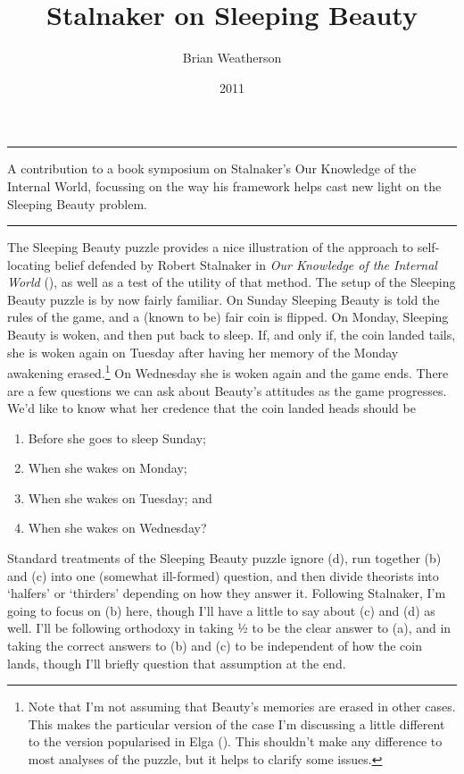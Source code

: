 \documentclass[
  10pt,
  letterpaper,
  DIV=11,
  numbers=noendperiod,
  twoside]{scrartcl}
\title{Stalnaker on Sleeping Beauty}
\author{Brian Weatherson}
\date{2011}
\providecommand{\tightlist}{%
  \setlength{\itemsep}{0pt}\setlength{\parskip}{0pt}}\usepackage{longtable,booktabs,array}
\renewenvironment{abstract}
 {\vspace{-1.25cm}
 \quotation\small\noindent\rule{\linewidth}{.5pt}\par\smallskip
 \noindent }
 {\par\noindent\rule{\linewidth}{.5pt}\endquotation}
\begin{document}
\maketitle
\begin{abstract}
A contribution to a book symposium on Stalnaker's Our Knowledge of the
Internal World, focussing on the way his framework helps cast new light
on the Sleeping Beauty problem.
\end{abstract}


The Sleeping Beauty puzzle provides a nice illustration of the approach
to self-locating belief defended by Robert Stalnaker in \emph{Our
Knowledge of the Internal World} (), as well as a test of the utility of that method. The setup of
the Sleeping Beauty puzzle is by now fairly familiar. On Sunday Sleeping
Beauty is told the rules of the game, and a (known to be) fair coin is
flipped. On Monday, Sleeping Beauty is woken, and then put back to
sleep. If, and only if, the coin landed tails, she is woken again on
Tuesday after having her memory of the Monday awakening
erased.\footnote{Note that I'm not assuming that Beauty's memories are
  erased in other cases. This makes the particular version of the case
  I'm discussing a little different to the version popularised in Elga
  (). This shouldn't make any difference to
  most analyses of the puzzle, but it helps to clarify some issues.} On
Wednesday she is woken again and the game ends. There are a few
questions we can ask about Beauty's attitudes as the game progresses.
We'd like to know what her credence that the coin landed heads should be

\begin{enumerate}
\def\labelenumi{\arabic{enumi}.}
\tightlist
\item
  Before she goes to sleep Sunday;
\item
  When she wakes on Monday;
\item
  When she wakes on Tuesday; and
\item
  When she wakes on Wednesday?
\end{enumerate}

Standard treatments of the Sleeping Beauty puzzle ignore (d), run
together (b) and (c) into one (somewhat ill-formed) question, and then
divide theorists into `halfers' or `thirders' depending on how they
answer it. Following Stalnaker, I'm going to focus on (b) here, though
I'll have a little to say about (c) and (d) as well. I'll be following
orthodoxy in taking ½ to be the clear answer to (a), and in taking the
correct answers to (b) and (c) to be independent of how the coin lands,
though I'll briefly question that assumption at the end.
\end{document}
